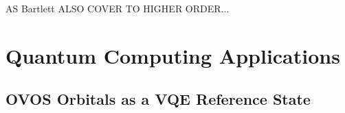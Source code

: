 AS Bartlett ALSO COVER TO HIGHER ORDER...


\section{Quantum Computing Applications}
%
%
%
\subsection{OVOS Orbitals as a VQE Reference State}
\label{sec:outlook_vqe}

